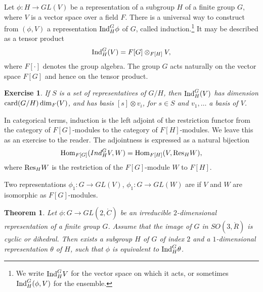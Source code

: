\documentclass{amsart}
\newtheorem{theorem}[equation]{Theorem}
\newtheorem{exercise}{Exercise}
\def\CC{\ring{C}}
\def\RR{\ring{R}}
\begin{document}
Let $\phi:H\to GL(V)$ be a representation of a subgroup $H$ of a
finite group $G$, where $V$ is a vector space over a field $F$.  There
is a universal way to construct from $(\phi,V)$ a representation ${\operatorname{Ind}}_H^G\phi$ of
$G$, called induction.\footnote{We write ${\operatorname{Ind}}_H^G V$ for the vector space on
which it acts, or sometimes ${\operatorname{Ind}}_H^G (\phi,V)$ for the ensemble.}  
It may be described as a tensor product
\[
{\operatorname{Ind}}_H^G(V) = F[G]\otimes_{F[H]} V,
\]
where $F[\cdot]$ denotes the group algebra.  The group $G$ acts
naturally on the vector space $F[G]$ and hence on the tensor product.

\begin{exercise}
If $S$ is a set of representatives of $G/H$, then ${\operatorname{Ind}}_H^G(V)$
has dimension ${\operatorname{card}}(G/H)\dim_F(V)$, and has basis $[s]\otimes v_i$,
for $s\in S$ and $v_1,\ldots $ a basis of $V$.
\end{exercise}

In categorical terms, induction is the left adjoint of the restriction functor
from the category of  $F[G]$-modules to the category of  $F[H]$-modules.
We leave this as an exercise to the reader.  The adjointness is expressed as a 
natural bijection
\begin{equation}\label{eqn:adjoint}
{\operatorname{Hom}}_{F[G]}(Ind_H^G V,W) = {\operatorname{Hom}}_{F[H]}(V,{\operatorname{Res}}_H W),
\end{equation}
where ${\operatorname{Res}}_H W$ is the restriction of the $F[G]$-module $W$ to $F[H]$.

Two representations $\phi_1:G\to GL(V)$, $\phi_1:G\to GL(W)$ are
 if $V$ and $W$ are isomorphic as $F[G]$-modules.

\begin{theorem}
  Let $\phi:G\to GL(2,\CC)$ be an irreducible $2$-dimensional
  representation of a finite group $G$.  Assume that the image of $G$
  in $SO(3,\RR)$ is cyclic or dihedral.  Then exists a subgroup
  $H$ of $G$ of index $2$ and a $1$-dimensional representation
  $\theta$ of $H$, such that $\phi$ is equivalent to
  ${\operatorname{Ind}}_H^G\theta$.
\end{theorem}
\end{document}
